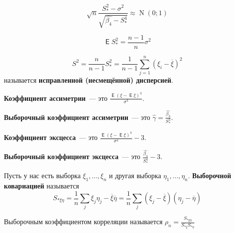\documentclass{article}
\DeclareMathOperator{\Expected}{\mathsf{E}}
\begin{document}
    \begin{claim}[Упражнение]
        \[
        \sqrt n\frac{S_*^2-\sigma^2}{\sqrt{\widehat{\beta_4}-S_*^4}}\approx\operatorname{N}(0;1)
        \]
    \end{claim}
    \begin{claim}[Упражнение]
        \[
        \Expected S_*^2=\frac{n-1}n\sigma^2
        \]
    \end{claim}
    \begin{definition}
        \[
        S^2=\frac n{n-1}S_*^2=\frac 1{n-1}\sum\limits_{j=1}^n(\xi_i-\overline \xi)^2
        \]
        называется \textbf{исправленной (несмещённой) дисперсией}.
    \end{definition}
    \begin{definition}
        \textbf{Коэффициент ассиметрии}~--- это $\displaystyle\frac{\Expected(\xi-\Expected\xi)^3}{\sigma^3}$.
    \end{definition}
    \begin{definition}
        \textbf{Выборочный коэффициент ассиметрии}~--- это $\displaystyle\widehat{\gamma}=\frac{\widehat{\beta_3}}{S_*^3}$.
    \end{definition}
    \begin{definition}
        \textbf{Коэффициент эксцесса}~--- это $\displaystyle\frac{\Expected(\xi-\Expected\xi)^4}{\sigma^4}-3$.
    \end{definition}
    \begin{definition}
        \textbf{Выборочный коэффициент эксцесса}~--- это $\displaystyle\frac{\widehat{\beta_4}}{S_*^4}-3$.
    \end{definition}
    \begin{definition}
        Пусть у нас есть выборка $\xi_1,\ldots,\xi_n$ и другая выборка $\eta_1,\ldots,\eta_n$. \textbf{Выборочной ковариацией} называется
        \[
        S_{*\xi\eta}=\frac1n\sum\limits_j\xi_j\eta_j-\overline{\xi}\overline{\eta}=\frac1n\sum\limits_j(\xi_j-\overline\xi)(\eta_j-\overline\eta)
        \]
    \end{definition}
    \begin{definition}
        Выборочным коэффициентом корреляции называется $\displaystyle \rho_n=\frac{S_{*\xi\eta}}{S_{*\xi}S_{*\eta}}$
    \end{definition}
\end{document}

